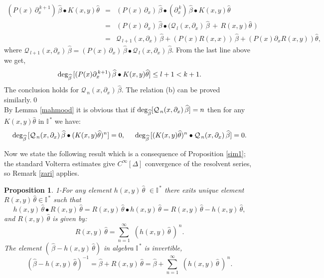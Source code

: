 \documentclass[10pt]{article}
\newcommand{\be}{\begin{equation}}
\newcommand{\ee}{\end{equation}}
\newcommand{\bea}{\begin{eqnarray}}
\newcommand{\eea}{\end{eqnarray}}
\newcommand{\nn}{\nonumber}
\newcommand{\rd}{\partial}
\newcommand{\mIs}{{{\mathbb I}}^{\,*}}
\newtheorem{pro}{Proposition}
\begin{document}
{{\bea (P(x)\,\rd^{\,k+1}_{x})\,\widehat{\beta}\bullet
K(x,y)\widehat{\theta}&=&
(P(x)\,\rd_{x})\,\widehat{\beta}\bullet(\rd^{\,k}_{x})\,\widehat{\beta}\bullet
K(x,y)\widehat{\theta}\nn\\&=&
(P(x)\,\rd_{x})\,\widehat{\beta}\bullet
\big({\mathcal{Q}_{\,l}}(x,\rd_{x})\,\widehat{\beta}\,+\,R(x,y)\widehat{\theta}\,\,\big)
\nn\\&=&{\mathcal{Q}_{\,l+1}}(x,\rd_{x})\,\widehat{\beta}+(P(x)R(x,x))\,\widehat{\beta}+(P(x)\rd_{x}
R(x,y))\widehat{\theta},\nn\eea where
${\mathcal{Q}_{\,l+1}}(x,\rd_{x})\,\widehat{\beta}=(P(x)\,\rd_{x})\,\widehat{\beta}\bullet
{\mathcal{Q}_{\,l}}(x,\rd_{x})\,\widehat{\beta}$. From the last line
above we get, \be {\rm
deg_{\widehat{\beta}}}\,[(P(x)\rd^{\,k+1}_{x})\,\widehat{\beta}\bullet
K(x,y)\widehat{\theta}]\le l+1<k+1.\nn\ee The conclusion holds for
${\mathcal{Q}_{\,n}}(x,\rd_{x})\,\widehat{\beta}$. The relation (b)
can be proved similarly.{\qed} \\

By Lemma \ref{mahmood} it is obvious that if ${\rm
deg_{\widehat{\beta}}}[{\mathcal{Q}_{\,n}}(x,\rd_{x})\,\widehat{\beta}]=n$
then for any $K(x,y)\widehat{\theta}$ in $\mIs$ we have: \be {\rm
deg_{\widehat{\beta}}}\,[{\mathcal{Q}_{\,n}}(x,\rd_{x})\,\widehat{\beta}\bullet
(K(x,y)\widehat{\theta})^{n}]= 0, \hspace{0.5cm} {\rm
deg_{\widehat{\beta}}}\,[
(K(x,y)\widehat{\theta})^n\bullet{\mathcal{Q}_{\,n}}(x,\rd_{x})\,\widehat{\beta}]=
0.  \label{rahamin2}\nn\ee

Now we state the following result which is a consequence of
Proposition \ref{sim1}; the standard Volterra estimates give
$C^{\infty}[\Delta]$ convergence of the resolvent series, so Remark
\ref{zari} applies.

\begin{pro}\label{sim}{1-For any element $h(x,y)\,\widehat{\theta}\,\,\in\mIs$ there exits unique element
$R(x,y)\,\widehat{\theta}\in\mIs$ such that \be
h(x,y)\,\widehat{\theta}\bullet
R(x,y)\,\widehat{\theta}=R(x,y)\,\widehat{\theta}\bullet
h(x,y)\,\widehat{\theta}=R(x,y)\,\widehat{\theta}-h(x,y)\,\widehat{\theta},\label{lales}\ee
and $R(x,y)\,\widehat{\theta}$ is given by: \be
R(x,y)\,\widehat{\theta} =\sum^{\infty}_{n=1}
\,\,(h(x,y)\,\widehat{\theta}\,)^{\, n}.\label{iraj}\ee The element
$(\,\widehat{\beta}-h(x,y)\,\widehat{\theta})$ in algebra $\mIs$ is
invertible, \be (\widehat{\beta}-h(x,y)\,\widehat{\theta})^{-1} =
\widehat{\beta}+R(x,y)\,\widehat{\theta}=\widehat{\beta}+
\sum^{\infty}_{n=1} {\,\,(h(x,y)\,\widehat{\theta}\,)}^{\,
 n}.\label{taghdim}\ee}\end{pro}

}}
\end{document}
